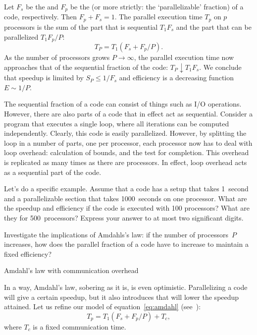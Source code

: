 Let $F_s$ be the
 and
$F_p$ be the  
(or more strictly: the `parallelizable'
fraction) of a code, respectively. Then $F_p+F_s=1$. The parallel
execution time $T_p$ on $p$ processors
is the sum of the part that is sequential
$T_1F_s$ and the part that can be parallelized $T_1F_p/P$:
\begin{equation}
  T_P=T_1(F_s+F_p/P).
  \label{eq:amdahl}
\end{equation}
As the number of processors grows
$P\rightarrow\infty$, the parallel execution time now approaches that
of the sequential fraction of the code: $T_P\downarrow
T_1F_s$. We conclude that speedup is limited by $S_P\leq 1/F_s$ and
efficiency is a decreasing function $E\sim 1/P$.

The sequential fraction of a code can consist of things such as I/O
operations. However, there are also parts of a code that in effect act
as sequential. Consider a program that executes a single loop, where
all iterations can be computed independently. Clearly, this code is
easily parallelized. However, by splitting the loop in a number of
parts, one per processor, each processor now has to deal with loop
overhead: calculation of bounds, and the test for completion. This
overhead is replicated as many times as there are processors. In
effect, loop overhead acts as a sequential part of the code.

\begin{exercise}
  Let's do a specific example. Assume that a code has a setup that
  takes 1~second and a parallelizable section that takes 1000~seconds
  on one processor. What are the speedup and efficiency if the code is
  executed with 100 processors? What are they for 500~processors?
  Express your answer to at most two significant digits.
\end{exercise}

\begin{exercise}
  Investigate the implications of Amdahls's law: if the number of
  processors~$P$ increases, how does the parallel fraction of a code
  have to increase to maintain a fixed efficiency?
\end{exercise}


 {Amdahl's law with communication overhead}

In a way, Amdahl's law, sobering as it is, is even optimistic.
Parallelizing a code will give a certain speedup, but it also
introduces  that will lower the
speedup attained. Let us refine our model of
equation~\eqref{eq:amdahl} (see~\cite[p.~367]{Landau:comp-phys}):
\[ T_p= T_1(F_s+F_p/P) +T_c, \]
where $T_c$ is a fixed communication time.

